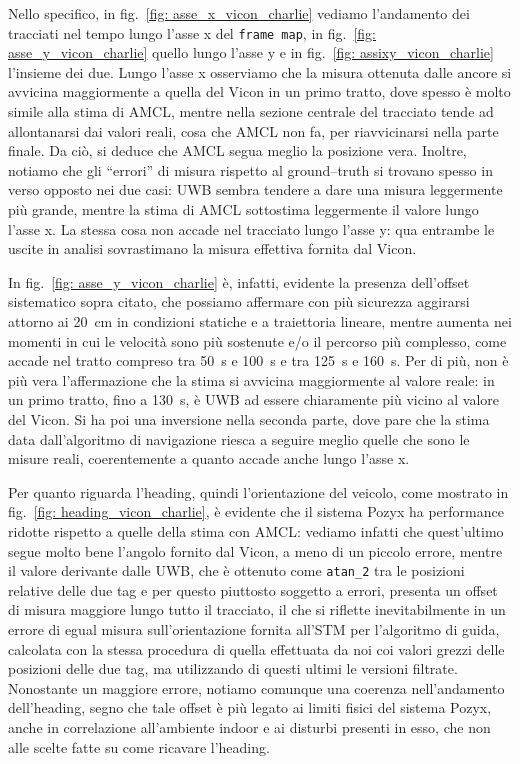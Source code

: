 Nello specifico, in fig.~\ref{fig: asse_x_vicon_charlie} vediamo l'andamento dei tracciati nel tempo lungo l'asse x del \verb|frame map|, in fig.~\ref{fig: asse_y_vicon_charlie} quello lungo l'asse  y e in fig.~\ref{fig: assixy_vicon_charlie} l'insieme dei due. Lungo l'asse x osserviamo che la misura ottenuta dalle ancore si avvicina maggiormente a quella del Vicon in un primo tratto, dove spesso è molto simile alla stima di AMCL, mentre nella sezione centrale del tracciato tende ad allontanarsi dai valori reali, cosa che AMCL non fa, per riavvicinarsi nella parte finale. 
Da ciò, si deduce che AMCL segua meglio la posizione vera. Inoltre, notiamo che gli ``errori'' di misura rispetto al ground--truth si trovano spesso in verso opposto nei due casi: UWB sembra tendere a dare una misura leggermente più grande, mentre la stima di AMCL sottostima leggermente il valore lungo l'asse x. 
La stessa cosa non accade nel tracciato lungo l'asse y: qua entrambe le uscite in analisi sovrastimano la misura effettiva fornita dal Vicon. 

In fig.~\ref{fig: asse_y_vicon_charlie} è, infatti, evidente la presenza dell'offset sistematico sopra citato, che possiamo affermare con più sicurezza aggirarsi attorno ai \SI{20}{\centi \metre} in condizioni statiche e a traiettoria lineare, mentre aumenta nei momenti in cui le velocità sono più sostenute e/o il percorso più complesso, come accade nel tratto compreso tra \SI{50}{\second} e \SI{100}{\second} e tra \SI{125}{\second} e \SI{160}{\second}. 
Per di più, non è più vera l'affermazione che la stima si avvicina maggiormente al valore reale: in un primo tratto, fino a \SI{130}{\second}, è UWB ad essere chiaramente più vicino al valore del Vicon. 
Si ha poi una inversione nella seconda parte, dove pare che la stima data dall'algoritmo di navigazione riesca a seguire meglio quelle che sono le misure reali, coerentemente a quanto accade anche lungo l'asse x.

\vspace{0.5cm}
Per quanto riguarda l'heading, quindi l'orientazione del veicolo, come mostrato in fig.~\ref{fig: heading_vicon_charlie}, \`e evidente che il sistema Pozyx ha performance ridotte rispetto a quelle della stima con AMCL: vediamo infatti che quest'ultimo segue molto bene l'angolo fornito dal Vicon, a meno di un piccolo errore, mentre il valore derivante dalle UWB, che è ottenuto come \verb|atan_2| tra le posizioni relative delle due tag e per questo piuttosto soggetto a errori, presenta un offset di misura maggiore lungo tutto il tracciato, il che si riflette inevitabilmente in un errore di egual misura sull'orientazione fornita all'STM per l'algoritmo di guida, calcolata con la stessa procedura di quella effettuata da noi coi valori grezzi delle posizioni delle due tag, ma utilizzando di questi ultimi le versioni filtrate. 
Nonostante un maggiore errore, notiamo comunque una coerenza nell'andamento dell'heading, segno che tale offset è più legato ai limiti fisici del sistema Pozyx, anche in correlazione all'ambiente indoor e ai disturbi presenti in esso, che non alle scelte fatte su come ricavare l'heading.

